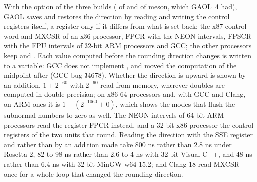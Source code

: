\medskip
With the option  of the three builds
( of  and
 of meson, which GAOL~4 had),
GAOL saves and restores the
direction by reading and writing the control registers itself, a register
only if it differs from what is set back: the x87 control word and MXCSR of
an x86 processor, FPCR with the NEON intervals, FPSCR with the FPU intervals
of 32-bit ARM processors and GCC; the other processors keep
 and . Each value computed before the
rounding direction changes is written to a  variable: GCC does
not implement , and moved the computation of
the midpoint after  (GCC bug 34678).\newinvfive{} Whether the
direction is upward is shown by an addition, $1 + 2^{-60}$ with $2^{-60}$
read from  memory, wherever doubles are computed in double
precision; on x86-64 processors and, with GCC and Clang, on ARM ones it is
$1 + (2^{-1060} + 0)$, which shows the modes that flush the subnormal numbers
to zero as well. The NEON intervals of 64-bit ARM processors read the
register FPCR instead, and a 32-bit x86 processor the control registers of
the two units that round. Reading the direction with the SSE register and
 rather than by an addition made  take 800 ns
rather than 2.8 ns under Rosetta 2, 82 to 98 ns rather than 2.6 to 4 ns with
32-bit Visual C++, and 48 ns rather than 6.4 ns with 32-bit MinGW-w64 15.2;
and Clang 18 read MXCSR once for a whole loop that changed the rounding
direction.

